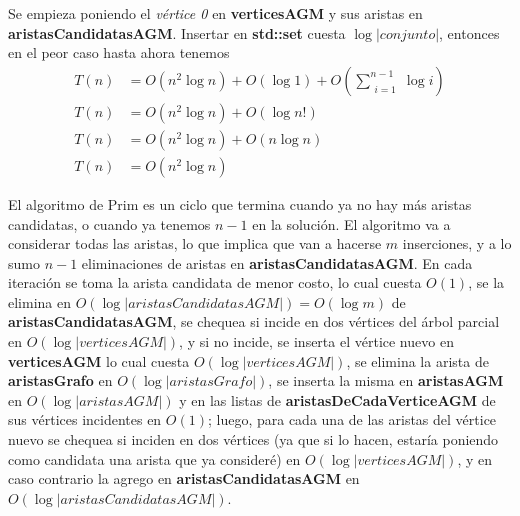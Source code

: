 Se empieza poniendo el \emph{vértice 0} en \textbf{verticesAGM} y sus aristas en \textbf{aristasCandidatasAGM}. Insertar en \textbf{std::set} cuesta $\log |conjunto|$, entonces en el peor caso hasta ahora tenemos 
\begin{align*}
T(n) &= O(n^2 \log n) + O(\log 1) + O\left(\sum\limits_{\substack{i = 1}}^{n-1} \log i\right) \\
T(n) &= O(n^2 \log n) + O(\log n!) \\
T(n) &= O(n^2 \log n) + O(n \log n) \\
T(n) &= O(n^2 \log n)
\end{align*}

El algoritmo de Prim es un ciclo que termina cuando ya no hay más aristas candidatas, o cuando ya tenemos $n - 1$ en la solución. El algoritmo va a considerar todas las aristas, lo que implica que van a hacerse $m$ inserciones, y a lo sumo $n-1$ eliminaciones de aristas en \textbf{aristasCandidatasAGM}. En cada iteración se toma la arista candidata de menor costo, lo cual cuesta $O(1)$, se la elimina en $O(\log |aristasCandidatasAGM|) = O(\log m)$ de \textbf{aristasCandidatasAGM}, se chequea si incide en dos vértices del árbol parcial en $O(\log |verticesAGM|)$, y si no incide, se inserta el vértice nuevo en \textbf{verticesAGM} lo cual cuesta $O(\log |verticesAGM|)$, se elimina la arista de \textbf{aristasGrafo} en $O(\log |aristasGrafo|)$, se inserta la misma en \textbf{aristasAGM} en $O(\log |aristasAGM|)$ y en las listas de \textbf{aristasDeCadaVerticeAGM} de sus vértices incidentes en $O(1)$; luego, para cada una de las aristas del vértice nuevo se chequea si inciden en dos vértices (ya que si lo hacen, estaría poniendo como candidata una arista que ya consideré) en $O(\log |verticesAGM|)$, y en caso contrario la agrego en \textbf{aristasCandidatasAGM} en $O(\log |aristasCandidatasAGM|)$.

